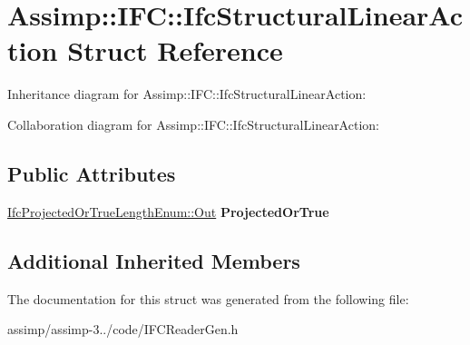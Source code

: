 \hypertarget{struct_assimp_1_1_i_f_c_1_1_ifc_structural_linear_action}{\section{Assimp\+:\+:I\+F\+C\+:\+:Ifc\+Structural\+Linear\+Action Struct Reference}
\label{struct_assimp_1_1_i_f_c_1_1_ifc_structural_linear_action}
}


Inheritance diagram for Assimp\+:\+:I\+F\+C\+:\+:Ifc\+Structural\+Linear\+Action\+:


Collaboration diagram for Assimp\+:\+:I\+F\+C\+:\+:Ifc\+Structural\+Linear\+Action\+:
\subsection*{Public Attributes}
\begin{DoxyCompactItemize}
\item 
\hypertarget{struct_assimp_1_1_i_f_c_1_1_ifc_structural_linear_action_ad1c688ca4ce8dbbf177a48e5a3e2948c}{\hyperlink{classboost_1_1shared__ptr}{Ifc\+Projected\+Or\+True\+Length\+Enum\+::\+Out} {\bfseries Projected\+Or\+True}}\label{struct_assimp_1_1_i_f_c_1_1_ifc_structural_linear_action_ad1c688ca4ce8dbbf177a48e5a3e2948c}

\end{DoxyCompactItemize}
\subsection*{Additional Inherited Members}


The documentation for this struct was generated from the following file\+:\begin{DoxyCompactItemize}
\item 
assimp/assimp-\/3../code/I\+F\+C\+Reader\+Gen.\+h\end{DoxyCompactItemize}
